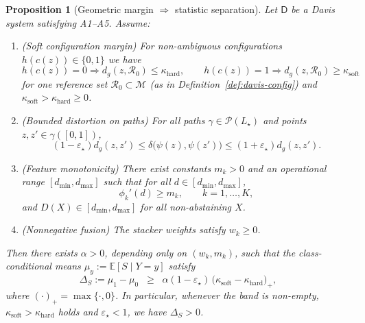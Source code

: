 \documentclass[11pt]{article}
\newtheorem{proposition}{Proposition}
\theoremstyle{remark}
\theoremstyle{plain}
\begin{document}
\begin{proposition}[Geometric margin $\Rightarrow$ statistic separation]
\label{prop:geom-to-stat}
Let $\mathsf{D}$ be a Davis system satisfying A1–A5. Assume:
\begin{enumerate}[label=(\alph*), leftmargin=2em]
  \item (Soft configuration margin) For non-ambiguous configurations
    $h(c(z)) \in \{0,1\}$ we have
    \[
    h(c(z)) = 0 \Rightarrow d_g(z,\mathcal{R}_0) \le \kappa_{\mathrm{hard}},\qquad
    h(c(z)) = 1 \Rightarrow d_g(z,\mathcal{R}_0) \ge \kappa_{\mathrm{soft}}
    \]
    for \emph{one} reference set $\mathcal{R}_0 \subset \mathcal{M}$ (as in Definition~\ref{def:davis-config})
    and $\kappa_{\mathrm{soft}} > \kappa_{\mathrm{hard}} \ge 0$.
  \item (Bounded distortion on paths) For all paths $\gamma \in \mathcal{P}(L_\star)$ and
    points $z,z' \in \gamma([0,1])$,
    \[
    (1-\varepsilon_\star) d_g(z,z') \le \delta\!\bigl(\psi(z),\psi(z')\bigr)
    \le (1+\varepsilon_\star) d_g(z,z').
    \]
  \item (Feature monotonicity) There exist constants $m_k > 0$ and an operational range
    $[d_{\min}, d_{\max}]$ such that for all $d \in [d_{\min}, d_{\max}]$,
    \[
    \phi_k'(d) \ge m_k,\qquad k=1,\dots,K,
    \]
    and $D(X) \in [d_{\min}, d_{\max}]$ for all non-abstaining $X$.
  \item (Nonnegative fusion) The stacker weights satisfy $w_k \ge 0$.
\end{enumerate}
Then there exists $\alpha > 0$, depending only on $(w_k, m_k)$, such that the class-conditional
means $\mu_y := \mathbb{E}[S \mid Y=y]$ satisfy
\[
\Delta_S := \mu_1 - \mu_0 \;\;\ge\;\; \alpha (1-\varepsilon_\star)\,
\bigl(\kappa_{\mathrm{soft}} - \kappa_{\mathrm{hard}}\bigr)_+,
\]
where $(\cdot)_+ = \max\{\cdot,0\}$. In particular, whenever the band is non-empty,
$\kappa_{\mathrm{soft}} > \kappa_{\mathrm{hard}}$ holds and $\varepsilon_\star < 1$, we have
$\Delta_S > 0$.
\end{proposition}
\end{document}
